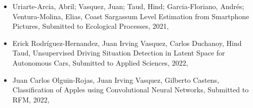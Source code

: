\begin{itemize} 
\item Uriarte-Arcia, Abril; Vasquez, Juan; Taud, Hind; Garcia-Floriano, Andrés; Ventura-Molina, Elias, Coast Sargassum Level Estimation from Smartphone Pictures, Submitted to Ecological Processes, 2021, \href{https://arxiv.org/abs/3939932}{\faFilePdfO} 
\item Erick Rodríguez-Hernandez, Juan Irving Vasquez, Carlos Duchanoy, Hind Taud, Unsupervised Driving Situation Detection in Latent Space for
Autonomous Cars, Submitted to Applied Sciences, 2022, \href{}{\faFilePdfO} 
\item Juan Carlos Olguin-Rojas, Juan Irving Vasquez, Gilberto Castens, Classification of Apples using Convolutional Neural Networks, Submitted to RFM, 2022, \href{}{\faFilePdfO} 
\end{itemize} 
